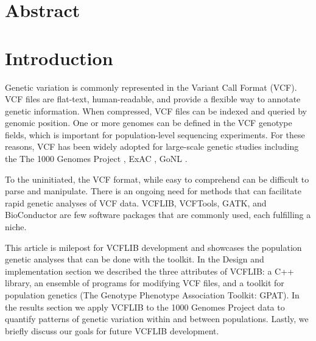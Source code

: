 \documentclass[10pt,letterpaper]{article}
\begin{document}
\section*{Abstract}




\linenumbers

\section*{Introduction}

Genetic variation is commonly represented in the Variant Call Format (VCF)\cite{vcftools}.  VCF files are flat-text, human-readable, and provide a flexible way to annotate genetic information.  When compressed, VCF files can be indexed and queried by genomic position\cite{tabix}. One or more genomes can be defined in the VCF genotype fields, which is important for population-level sequencing experiments. For these reasons, VCF has been widely adopted for large-scale genetic studies including the The 1000 Genomes Project \cite{1kg}, ExAC \cite{exac}, GoNL \cite{gonl}.

To the uninitiated, the VCF format, while easy to comprehend can be difficult to parse and manipulate. There is an ongoing need for methods that can facilitate rapid genetic analyses of VCF data.  VCFLIB, VCFTools\cite{vcftools}, GATK,  and BioConductor are few software packages that are commonly used, each fulfilling a niche. 

This article is milepost for VCFLIB development and showcases the population genetic analyses that can be done with the toolkit. In the Design and implementation section we described the three attributes of VCFLIB: a C++ library, an ensemble of programs for modifying VCF files, and a toolkit for population genetics (The Genotype Phenotype Association Toolkit: GPAT). In the results section we apply VCFLIB to the 1000 Genomes Project data to quantify patterns of genetic variation within and between populations.  Lastly, we briefly discuss our goals for future VCFLIB development.



\end{document}
